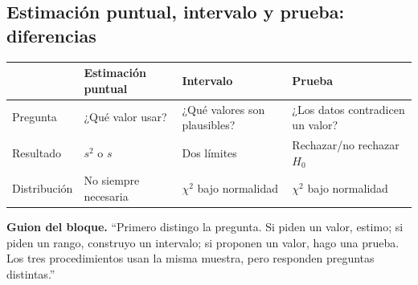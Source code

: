 \documentclass[11pt,a4paper]{article}
\begin{document}
\subsection{Estimación puntual, intervalo y prueba: diferencias}
\begin{table}[H]\centering
\begin{tabularx}{\textwidth}{L{3cm}YYY}\toprule
&\textbf{Estimación puntual}&\textbf{Intervalo}&\textbf{Prueba}\\\midrule
Pregunta&¿Qué valor usar?&¿Qué valores son plausibles?&¿Los datos contradicen un valor?\\
Resultado&$s^2$ o $s$&Dos límites&Rechazar/no rechazar $H_0$\\
Distribución&No siempre necesaria&$\chi^2$ bajo normalidad&$\chi^2$ bajo normalidad\\\bottomrule
\end{tabularx}\end{table}
\begin{oral}\textbf{Guion del bloque.} ``Primero distingo la pregunta. Si piden un valor, estimo; si piden un rango, construyo un intervalo; si proponen un valor, hago una prueba. Los tres procedimientos usan la misma muestra, pero responden preguntas distintas.''\end{oral}
\end{document}
